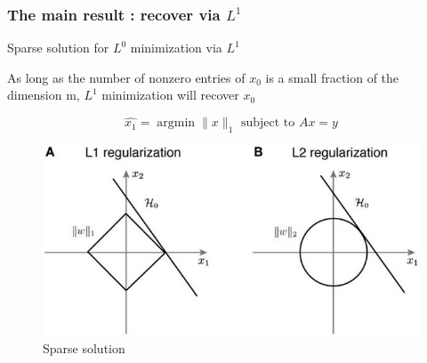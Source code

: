 \documentclass{beamer}
\DeclareMathOperator{\argmin}{argmin} %
\begin{document}
		
\begin{frame}

		\frametitle{The main result : recover via $L^{1}$}		
			
\begin{block}{Sparse solution for $L^{0}$ minimization via $L^{1}$}

As long as the number of nonzero entries of $x_{0}$ is a small fraction of the dimension m, $L^{1}$ minimization will recover $x_{0}$ 

$$ \hat{x_{1}}= \argmin \|x\|_{1}  \mbox{ subject to } Ax=y$$

\end{block}

			\begin{figure}[!ht]
			\begin{center}
			\includegraphics[scale=0.3]{sparse_rep.png}
			\end{center}
			\caption{Sparse solution}
			\label{fa}
			\end{figure}

\end{frame}

\end{document}
